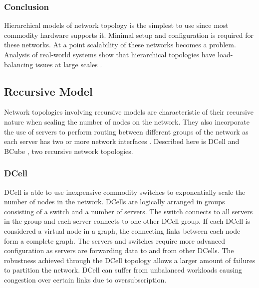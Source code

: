 \documentclass[fullapage,12pt]{article}
\begin{document}

\subsubsection{Conclusion} \label{ssub:hierarchical-concl}


Hierarchical models of network topology is the simplest to use since most commodity hardware supports it. Minimal setup and configuration is required for these networks. At a point scalability of these networks becomes a problem. Analysis of real-world systems show that hierarchical topologies have load-balancing issues at large scales \cite{singla2012jellyfish}.



\subsection{Recursive Model} \label{sub:net-recursive}

Network topologies involving recursive models are characteristic of their recursive nature when scaling the number of nodes on the network. They also incorporate the use of servers to perform routing between different groups of the network as each server has two or more network interfaces \cite{wang2015survey, xia2016survey}. Described here is DCell \cite{guo2008dcell} and BCube \cite{guo2009bcube}, two recursive network topologies.

\subsubsection{DCell} \label{subp:dcell}

DCell is able to use inexpensive commodity switches to exponentially scale the number of nodes in the network. DCells are logically arranged in groups consisting of a switch and a number of servers. The switch connects to all servers in the group and each server connects to one other DCell group. If each DCell is considered a virtual node in a graph, the connecting links between each node form a complete graph. The servers and switches require more advanced configuration as servers are forwarding data to and from other DCells. The robustness achieved through the DCell topology allows a larger amount of failures to partition the network. DCell can suffer from unbalanced workloads causing congestion over certain links due to oversubscription.
\end{document}
